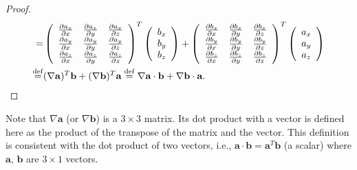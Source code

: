 \documentclass[11pt]{article}              %
\begin{document}
\begin{proof}
\begin{align}
	=&\left(\begin{array}{ccc}\frac{\partial a_x}{\partial x}&\frac{\partial a_x}{\partial y}&\frac{\partial a_x}{\partial z}\\\frac{\partial a_y}{\partial x}&\frac{\partial a_y}{\partial y}&\frac{\partial a_y}{\partial z}\\\frac{\partial a_z}{\partial x}&\frac{\partial a_z}{\partial y}&\frac{\partial a_z}{\partial z}\end{array}\right)^T\left(\begin{array}{c}b_x\\b_y\\b_z\end{array}\right)+\left(\begin{array}{ccc}\frac{\partial b_x}{\partial x}&\frac{\partial b_x}{\partial y}&\frac{\partial b_x}{\partial z}\\\frac{\partial b_y}{\partial x}&\frac{\partial b_y}{\partial y}&\frac{\partial b_y}{\partial z}\\\frac{\partial b_z}{\partial x}&\frac{\partial b_z}{\partial y}&\frac{\partial b_z}{\partial z}\end{array}\right)^T\left(\begin{array}{c}a_x\\a_y\\a_z\end{array}\right)\notag\\
	\stackrel{\operatorname{def}}{=}&(\nabla{\mathbf a})^T{\mathbf b}+(\nabla{\mathbf b})^T{\mathbf a}\stackrel{\operatorname{def}}{=}\nabla{\mathbf a}\cdot{\mathbf b}+\nabla{\mathbf b}\cdot{\mathbf a}.\notag
\end{align}
\end{proof}
Note that $\nabla {\mathbf a}$ (or $\nabla {\mathbf b}$) is a $3\times 3$ matrix. Its dot product with a vector is defined here as the product of the transpose of the matrix and the vector. This definition is consistent with the dot product of two vectors, i.e., ${\mathbf a}\cdot{\mathbf b}={\mathbf a}^T{\mathbf b}$ (a scalar) where ${\mathbf a}$, ${\mathbf b}$ are $3\times 1$ vectors.
\end{document}
